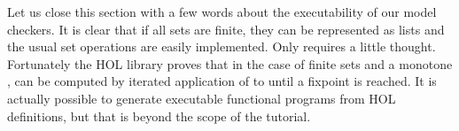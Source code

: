 \begin{isabellebody}
\begin{isamarkuptext}
Let us close this section with a few words about the executability of our model checkers.
It is clear that if all sets are finite, they can be represented as lists and the usual
set operations are easily implemented. Only  requires a little thought.
Fortunately the HOL library proves that in the case of finite sets and a monotone ,
 can be computed by iterated application of  to \isa{{\isacharbraceleft}{\isacharbraceright}} until
a fixpoint is reached. It is actually possible to generate executable functional programs
from HOL definitions, but that is beyond the scope of the tutorial.%
\end{isamarkuptext}%
\end{isabellebody}%
